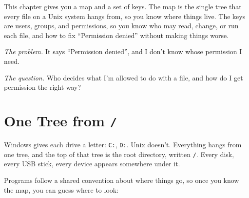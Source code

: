 
\begin{chapterintro}

This chapter gives you a map and a set of keys. The map is the single tree that every file on a Unix system hangs from, so you know where things live. The keys are users, groups, and permissions, so you know who may read, change, or run each file, and how to fix ``Permission denied'' without making things worse.

\end{chapterintro}

\emph{The problem.} It says ``Permission denied'', and I don't know whose permission I need.

\emph{The question.} Who decides what I'm allowed to do with a file, and how do I get permission the right way?

\section{\texorpdfstring{One Tree from \texttt{/}}{One Tree from /}}\label{03-files-folders-and-who-may-touch-them:one-tree-from-}

Windows gives each drive a letter: \texttt{C:}, \texttt{D:}. Unix doesn't. Everything hangs from one tree, and the top of that tree is the root directory, written \texttt{/}. Every disk, every USB stick, every device appears somewhere under it.


Programs follow a shared convention about where things go, so once you know the map, you can guess where to look:

